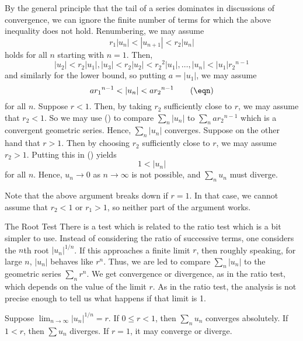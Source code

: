 By the general principle that the tail of a series dominates
in discussions of convergence, we can ignore the finite number
of terms for
which the above inequality does not hold. 
  Renumbering, we may assume
$$
r_1|u_n| < |u_{n+1}|< r_2|u_n|
$$
holds for all $n$ starting with $n = 1$.  Then,
$$
  |u_2| < r_2|u_1|, |u_3|< r_2|u_2| < r_2{}^2|u_1|, \dots,
 |u_n| < |u_1|r_2{}^{n-1}
$$
and similarly for the lower bound, so putting $a = |u_1|$,
 we may assume
\nexteqn
$$
   ar_1{}^{n-1} < |u_n| < ar_2{}^{n-1}\tag\eqn
$$
for all $n$.  Suppose $r < 1$.  Then, by taking $r_2$
sufficiently close to $r$, we may assume that $r_2 < 1$.
 So we may use (\eqn) to compare $\sum_n |u_n|$ to
$\sum_n ar_2{}^{n-1}$ which is a convergent geometric series.
Hence, $\sum_n |u_n|$ converges.  Suppose on the other hand
that $r > 1$.  Then by choosing $r_2$ sufficiently close to
$r$, we may assume $r_2 > 1$.   Putting this in (\eqn)
yields
$$
   1 < |u_n|
$$
for all $n$.  Hence, $u_n \to 0$ as $n \to \infty$ is not
possible, and $\sum_n u_n$ must diverge.

Note that the above argument breaks down if $r = 1$.  In that
case, we cannot assume that $r_2 < 1$ or $r_1 > 1$, so
neither part of the argument works.

\subhead The Root Test \endsubhead
There is a test which is related to the ratio test which is
a bit simpler to use.  Instead of considering the ratio of
successive terms, one considers the $n$th root $|u_n|^{1/n}$.
If this approaches a finite limit $r$, then roughly speaking,
for large $n$, $|u_n|$ behaves like $r^n$.   Thus, we are led to compare
$\sum_n |u_n|$ to the geometric series $\sum_n r^n$.  We
get convergence or divergence, as in the ratio test,
which depends on the value of the limit $r$.  As in the ratio
test, the analysis is not precise enough to tell us what
happens if that limit is 1.

  Suppose $\lim_{n\to\infty}|u_n|^{1/n} = r$.
If $0\le r < 1$, then $\sum_n u_n$ converges absolutely.  If
$1 < r$, then $\sum u_n$ diverges.  If $r = 1$, it may converge or
diverge.
\endproclaim
{}%

